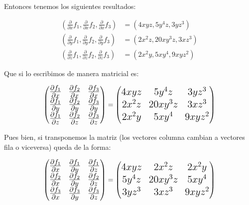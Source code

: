 Entonces tenemos los siguientes resultados:

\begin{equation*}
\begin{split}
    (\frac{\partial}{\partial x} f_1,\frac{\partial}{\partial x} f_2,\frac{\partial}{\partial x} f_3)&=(4xyz,5y^4z,3yz^3)\\
    (\frac{\partial}{\partial y} f_1,\frac{\partial}{\partial y} f_2,\frac{\partial}{\partial y} f_3)&=(2x^2z,20xy^3z,3xz^3)\\ 
    (\frac{\partial}{\partial z} f_1,\frac{\partial}{\partial z} f_2,\frac{\partial}{\partial z} f_3)&=(2x^2y,5xy^4,9xyz^2)
\end{split}
\end{equation*}

Que si lo escribimos de manera matricial es:

\begin{equation*}
\Large
\begin{pmatrix}
\frac{\partial f_1}{\partial x} & \frac{\partial f_2}{\partial x} & \frac{\partial f_3}{\partial x}\\
\frac{\partial f_1}{\partial y} & \frac{\partial f_2}{\partial y} & \frac{\partial f_3}{\partial y}\\
\frac{\partial f_1}{\partial z} & \frac{\partial f_2}{\partial z} & \frac{\partial f_3}{\partial z}
\end{pmatrix}
=
\begin{pmatrix}
4xyz & 5y^4z & 3yz^3\\
2x^2z & 20xy^3z & 3xz^3\\
2x^2y & 5xy^4 & 9xyz^2
\end{pmatrix}
\end{equation*} 

Pues bien, si transponemos la matriz (los vectores columna cambian a vectores fila o viceversa) queda de la forma:

\begin{equation*}
\Large
\begin{pmatrix}
\frac{\partial f_1}{\partial x} & \frac{\partial f_1}{\partial y} & \frac{\partial f_1}{\partial z}\\
\frac{\partial f_2}{\partial x} & \frac{\partial f_2}{\partial y} & \frac{\partial f_2}{\partial z}\\
\frac{\partial f_3}{\partial x} & \frac{\partial f_3}{\partial y} & \frac{\partial f_3}{\partial z}
\end{pmatrix}
=
\begin{pmatrix}
4xyz & 2x^2z & 2x^2y\\
5y^4z & 20xy^3z & 5xy^4\\
3yz^3 & 3xz^3 & 9xyz^2
\end{pmatrix}
\end{equation*} 

